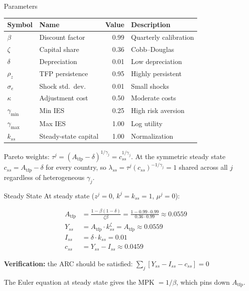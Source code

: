 \documentclass[aspectratio=169,11pt]{beamer}
\begin{document}
\begin{frame}{Parameters}
\begin{center}
\begin{tabular}{llrl}
\toprule
\textbf{Symbol} & \textbf{Name} & \textbf{Value} & \textbf{Description} \\
\midrule
$\beta$ & Discount factor & 0.99 & Quarterly calibration \\
$\zeta$ & Capital share & 0.36 & Cobb--Douglas \\
$\delta$ & Depreciation & 0.01 & Low depreciation \\
$\rho_z$ & TFP persistence & 0.95 & Highly persistent \\
$\sigma_e$ & Shock std.\ dev. & 0.01 & Small shocks \\
$\kappa$ & Adjustment cost & 0.50 & Moderate costs \\
$\gamma_{\min}$ & Min IES & 0.25 & High risk aversion \\
$\gamma_{\max}$ & Max IES & 1.00 & Log utility \\
$k_{ss}$ & Steady-state capital & 1.00 & Normalization \\
\bottomrule
\end{tabular}
\end{center}

\vspace{0.3em}
{\small Pareto weights: $\tau^j = (A_{\text{tfp}} - \delta)^{1/\gamma_j} = c_{ss}^{1/\gamma_j}$.  At the symmetric steady state $c_{ss} = A_{\text{tfp}} - \delta$ for every country, so $\lambda_{ss} = \tau^j (c_{ss})^{-1/\gamma_j} = 1$ shared across all $j$ regardless of heterogeneous $\gamma_j$.}
\end{frame}

\begin{frame}{Steady State}
At steady state ($z^j = 0$, $k^j = k_{ss} = 1$, $\mu^j = 0$):

\vspace{0.3em}
\begin{align*}
A_{\text{tfp}} &= \frac{1 - \beta(1-\delta)}{\zeta\beta} = \frac{1 - 0.99 \cdot 0.99}{0.36 \cdot 0.99} \approx 0.0559 \\[4pt]
Y_{ss} &= A_{\text{tfp}} \cdot k_{ss}^\zeta = A_{\text{tfp}} \approx 0.0559 \\[4pt]
I_{ss} &= \delta \cdot k_{ss} = 0.01 \\[4pt]
c_{ss} &= Y_{ss} - I_{ss} \approx 0.0459
\end{align*}

\vspace{0.3em}
\textbf{Verification:} the ARC should be satisfied: $\sum_j [Y_{ss} - I_{ss} - c_{ss}] = 0$ \checkmark

\vspace{0.3em}
{\small The Euler equation at steady state gives the MPK $= 1/\beta$, which pins down $A_{\text{tfp}}$.}
\end{frame}
\end{document}

